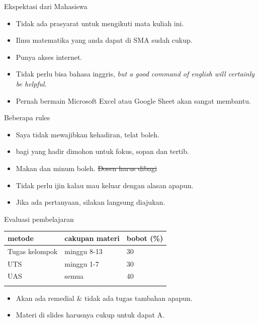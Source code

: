 \documentclass[
  ignorenonframetext,
]{beamer}
\providecommand{\tightlist}{%
  \setlength{\itemsep}{0pt}\setlength{\parskip}{0pt}}\usepackage{longtable,booktabs,array}
\begin{document}
\begin{frame}{Ekspektasi dari Mahasiswa}
\label{ekspektasi-dari-mahasiswa}
\begin{itemize}
\tightlist
\item
  Tidak ada prasyarat untuk mengikuti mata kuliah ini.
\item
  Ilmu matematika yang anda dapat di SMA sudah cukup.
\item
  Punya akses internet.
\item
  Tidak perlu bisa bahasa inggris, \emph{but a good command of english
  will certainly be helpful}.
\item
  Pernah bermain Microsoft Excel atau Google Sheet akan sangat membantu.
\end{itemize}
\end{frame}

\begin{frame}{Beberapa rules}
\label{beberapa-rules}
\begin{itemize}
\tightlist
\item
  Saya tidak mewajibkan kehadiran, telat boleh.
\item
  bagi yang hadir dimohon untuk fokus, sopan dan tertib.
\item
  Makan dan minum boleh. \st{Dosen harus dibagi}
\item
  Tidak perlu ijin kalau mau keluar dengan alasan apapun.
\item
  Jika ada pertanyaan, silakan langsung diajukan.
\end{itemize}
\end{frame}

\begin{frame}{Evaluasi pembelajaran}
\label{evaluasi-pembelajaran}
\begin{longtable}[]{@{}lll@{}}
\toprule\noalign{}
metode & cakupan materi & bobot (\%) \\
\midrule\noalign{}
\endhead
Tugas kelompok & minggu 8-13 & 30 \\
UTS & minggu 1-7 & 30 \\
UAS & semua & 40 \\
\bottomrule\noalign{}
\end{longtable}

\begin{itemize}
\tightlist
\item
  Akan ada remedial \& tidak ada tugas tambahan apapun.
\item
  Materi di slides harusnya cukup untuk dapat A.
\end{itemize}
\end{frame}
\end{document}
